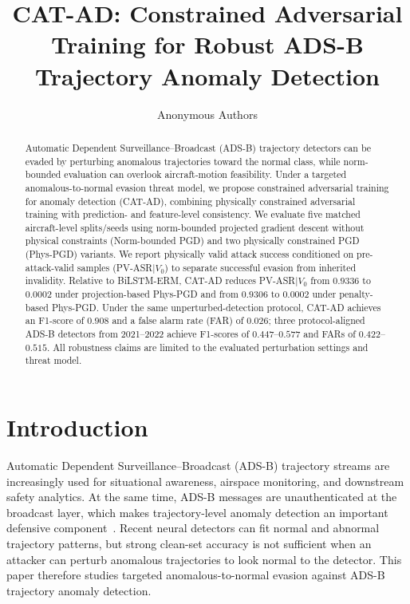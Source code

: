 \documentclass[runningheads]{llncs}
\title{CAT-AD: Constrained Adversarial Training for Robust ADS-B Trajectory Anomaly Detection}
\author{Anonymous Authors}
\institute{Anonymous Institution}
\begin{document}
\maketitle

\begin{abstract}
Automatic Dependent Surveillance--Broadcast (ADS-B) trajectory detectors can be evaded by perturbing anomalous trajectories toward the normal class, while norm-bounded evaluation can overlook aircraft-motion feasibility.
Under a targeted anomalous-to-normal evasion threat model, we propose constrained adversarial training for anomaly detection (CAT-AD), combining physically constrained adversarial training with prediction- and feature-level consistency.
We evaluate five matched aircraft-level splits/seeds using norm-bounded projected gradient descent without physical constraints (Norm-bounded PGD) and two physically constrained PGD (Phys-PGD) variants.
We report physically valid attack success conditioned on pre-attack-valid samples (PV-ASR$\mid V_0$) to separate successful evasion from inherited invalidity.
Relative to BiLSTM-ERM, CAT-AD reduces PV-ASR$\mid V_0$ from $0.9336$ to $0.0002$ under projection-based Phys-PGD and from $0.9306$ to $0.0002$ under penalty-based Phys-PGD.
Under the same unperturbed-detection protocol, CAT-AD achieves an F1-score of $0.908$ and a false alarm rate (FAR) of $0.026$; three protocol-aligned ADS-B detectors from 2021--2022 achieve F1-scores of $0.447$--$0.577$ and FARs of $0.422$--$0.515$.
All robustness claims are limited to the evaluated perturbation settings and threat model.
\end{abstract}


\section{Introduction}
\label{sec:introduction}

Automatic Dependent Surveillance--Broadcast (ADS-B) trajectory streams are increasingly used for situational awareness, airspace monitoring, and downstream safety analytics.
At the same time, ADS-B messages are unauthenticated at the broadcast layer, which makes trajectory-level anomaly detection an important defensive component~\cite{strohmeier2015security}.
Recent neural detectors can fit normal and abnormal trajectory patterns, but strong clean-set accuracy is not sufficient when an attacker can perturb anomalous trajectories to look normal to the detector.
This paper therefore studies targeted anomalous-to-normal evasion against ADS-B trajectory anomaly detection.
\end{document}
